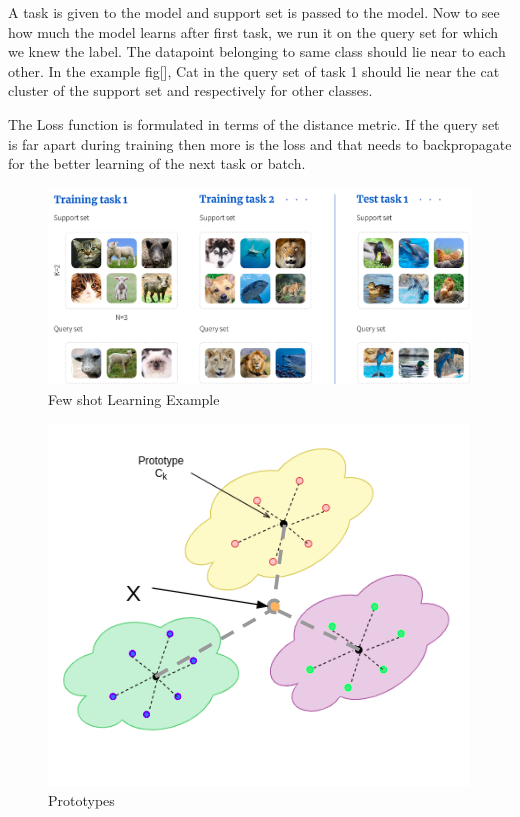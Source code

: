     A task is given to the model and support set is passed to the model. Now to see how much the model learns after first task, we run it on the query set for which we knew the label. The datapoint belonging to same class should lie near to each other. In the example fig[], Cat in the query set of task 1 should lie near the cat cluster of the support set and respectively for other classes.
	
	The Loss function is formulated in terms of the distance metric. If the query set is far apart during training then more is the loss and that needs to backpropagate for the better learning of the next task or batch.

\begin{figure}[t]
    \centering
    \includegraphics[scale=0.4]{figures/chapter-3/unsupervised_few_shot.png}
    \caption{Few shot Learning Example}
     \label{fig:unsupervised-fewshot}
\end{figure}


\begin{figure}[t]
    \centering
    \includegraphics[scale=0.5]{figures/chapter-3/prototypes.png}
    \caption{Prototypes}
     \label{fig:unsupervised-prototypes}
\end{figure}

